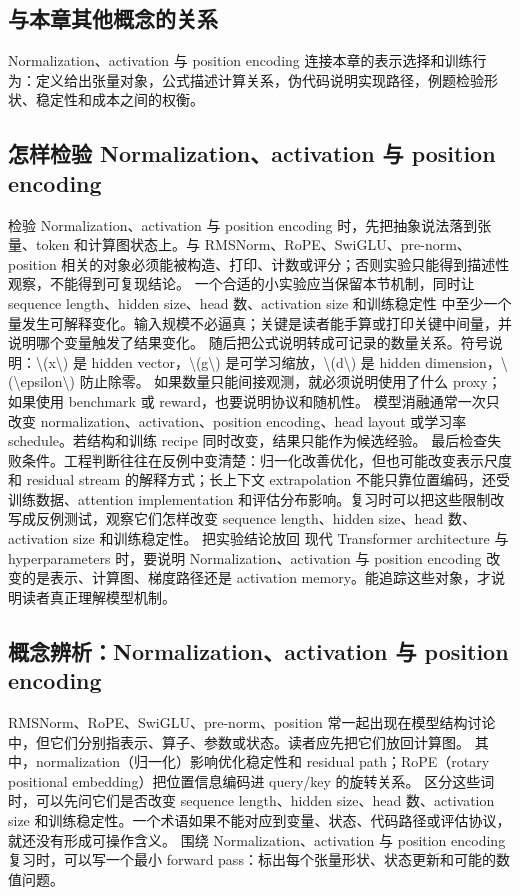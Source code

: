 \documentclass[a4paper]{article}
\begin{document}
\subsection{与本章其他概念的关系}
Normalization、activation 与 position encoding 连接本章的表示选择和训练行为：定义给出张量对象，公式描述计算关系，伪代码说明实现路径，例题检验形状、稳定性和成本之间的权衡。
\subsection{怎样检验 Normalization、activation 与 position encoding}
检验 Normalization、activation 与 position encoding 时，先把抽象说法落到张量、token 和计算图状态上。与 RMSNorm、RoPE、SwiGLU、pre-norm、position 相关的对象必须能被构造、打印、计数或评分；否则实验只能得到描述性观察，不能得到可复现结论。
一个合适的小实验应当保留本节机制，同时让 sequence length、hidden size、head 数、activation size 和训练稳定性 中至少一个量发生可解释变化。输入规模不必逼真；关键是读者能手算或打印关键中间量，并说明哪个变量触发了结果变化。
随后把公式说明转成可记录的数量关系。符号说明：\textbackslash{}(x\textbackslash{}) 是 hidden vector，\textbackslash{}(g\textbackslash{}) 是可学习缩放，\textbackslash{}(d\textbackslash{}) 是 hidden dimension，\textbackslash{}(\textbackslash{}epsilon\textbackslash{}) 防止除零。 如果数量只能间接观测，就必须说明使用了什么 proxy；如果使用 benchmark 或 reward，也要说明协议和随机性。
模型消融通常一次只改变 normalization、activation、position encoding、head layout 或学习率 schedule。若结构和训练 recipe 同时改变，结果只能作为候选经验。
最后检查失败条件。工程判断往往在反例中变清楚：归一化改善优化，但也可能改变表示尺度和 residual stream 的解释方式；长上下文 extrapolation 不能只靠位置编码，还受训练数据、attention implementation 和评估分布影响。复习时可以把这些限制改写成反例测试，观察它们怎样改变 sequence length、hidden size、head 数、activation size 和训练稳定性。
把实验结论放回 现代 Transformer architecture 与 hyperparameters 时，要说明 Normalization、activation 与 position encoding 改变的是表示、计算图、梯度路径还是 activation memory。能追踪这些对象，才说明读者真正理解模型机制。
\subsection{概念辨析：Normalization、activation 与 position encoding}
RMSNorm、RoPE、SwiGLU、pre-norm、position 常一起出现在模型结构讨论中，但它们分别指表示、算子、参数或状态。读者应先把它们放回计算图。
其中，normalization（归一化）影响优化稳定性和 residual path；RoPE（rotary positional embedding）把位置信息编码进 query/key 的旋转关系。
区分这些词时，可以先问它们是否改变 sequence length、hidden size、head 数、activation size 和训练稳定性。一个术语如果不能对应到变量、状态、代码路径或评估协议，就还没有形成可操作含义。
围绕 Normalization、activation 与 position encoding 复习时，可以写一个最小 forward pass：标出每个张量形状、状态更新和可能的数值问题。
\end{document}
